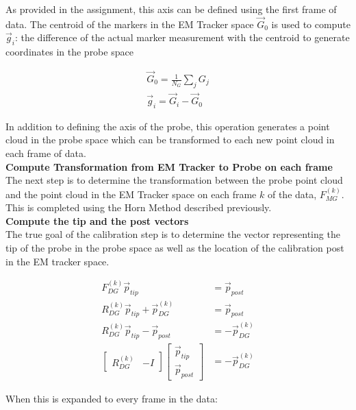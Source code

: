 \documentclass[letterpaper, 11pt]{report}
\begin{document}
As provided in the assignment, this axis can be defined using the first frame of data. The centroid of the markers in the EM Tracker space $\vec G_0$ is used to compute $\vec g_i$: the difference of the actual marker measurement with the centroid to generate coordinates in the probe space

\begin{align*}
    \vec G_0 = \frac{1}{N_G}\sum_j G_j \\
    \vec g_i = \vec G_i - \vec G_0 
\end{align*}

In addition to defining the axis of the probe, this operation generates a point cloud in the probe space which can be transformed to each new point cloud in each frame of data.
\\

\textbf{Compute Transformation from EM Tracker to Probe on each frame}\\
The next step is to determine the transformation between the probe point cloud and the point cloud in the EM Tracker space on each frame $k$ of the data, $F_{MG}^{(k)}$. This is completed using the Horn Method described previously. 
\\

\textbf{Compute the tip and the post vectors}\\
The true goal of the calibration step is to determine the vector representing the tip of the probe in the probe space as well as the location of the calibration post in the EM tracker space.

\begin{align*}
    F_{DG}^{(k)} \vec p_{tip} &= \vec p_{post}  \\
    R_{DG}^{(k)} \vec p_{tip} + \vec p_{DG}^{(k)} &=  \vec p_{post}\\
    R_{DG}^{(k)} \vec p_{tip} - \vec p_{post} &= -\vec p_{DG}^{(k)} \\
    \begin{bmatrix}
        R_{DG}^{(k)} & -I
    \end{bmatrix} \begin{bmatrix}
                        \vec p_{tip} \\
                        \vec p_{post}
                   \end{bmatrix} &= -\vec p_{DG}^{(k)}
\end{align*}

When this is expanded to every frame in the data:
\end{document}
